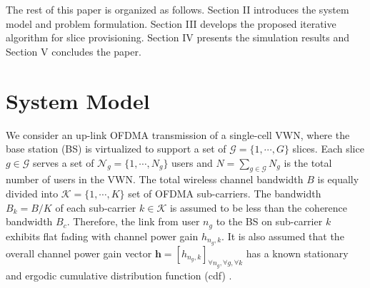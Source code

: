 \documentclass[journal,draftclsnofoot,12pt,onecolumn]{IEEEtran}
\begin{document}


The rest of this paper is organized as follows. Section II introduces the system model and problem formulation. Section III develops the proposed iterative algorithm {for slice provisioning}. Section IV presents the simulation results and Section V concludes the paper.

\section{System Model}
We consider an up-link OFDMA transmission of a single-cell VWN, where the base station (BS) is virtualized to support a set of $\mathcal{G} = \{1,\cdots,G\}$ slices. Each slice $g \in \mathcal{G}$ serves a set of $\mathcal{N}_g  = \{1,\cdots,N_g\}$ users and $N = \sum_{g\in \mathcal{G}}N_g$ is the total number of users in the VWN. The total wireless channel bandwidth $B$ is equally divided into $\mathcal{K} = \{1,\cdots,K\}$ {set of OFDMA sub-carriers}. {The bandwidth $B_k = B/K$ of each sub-carrier $k \in \mathcal{K}$ is} assumed to be less than the coherence bandwidth $B_c$. Therefore, the link from user $n_g$ to the BS on sub-carrier $k$  exhibits flat fading with channel power gain  $h_{n_g,k}$. It is also assumed that the overall channel power gain vector $\textbf{h} = [h_{n_g,k}]_{\forall n_g,\forall g,\forall k}$ has a known stationary and ergodic cumulative distribution function (cdf) \cite{4217781,4472014}. %
\end{document}
